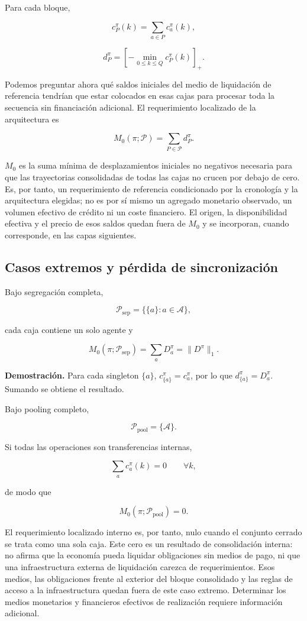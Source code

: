 \documentclass[10pt,a5paper,twoside]{article}
\begin{document}
Para cada bloque,

\[
c^\pi_P(k)
=
\sum_{a\in P}c^\pi_a(k),
\]

\[
d^\pi_P
=
\left[
-\min_{0\le k\le Q}c^\pi_P(k)
\right]_+.
\]

Podemos preguntar ahora qué saldos iniciales del medio de liquidación de referencia
tendrían que estar colocados en esas cajas para procesar toda la secuencia sin
financiación adicional. El requerimiento localizado de la arquitectura es

\[
M_0(\pi;\mathcal P)
=
\sum_{P\in\mathcal P}d^\pi_P.
\]

\(M_0\) es la suma mínima de desplazamientos iniciales no negativos
necesaria para que las trayectorias consolidadas de todas las cajas no
crucen por debajo de cero. Es, por tanto, un requerimiento de referencia
condicionado por la cronología y la arquitectura elegidas; no es por sí mismo
un agregado monetario observado, un volumen efectivo de crédito ni un coste
financiero. El origen, la disponibilidad efectiva y el precio de esos saldos
quedan fuera de \(M_0\) y se incorporan, cuando corresponde, en las capas
siguientes.

\subsection{Casos extremos y pérdida de sincronización}\label{casos-extremos-y-puxe9rdida-de-sincronizaciuxf3n}

Bajo segregación completa,

\[
\mathcal P_{\mathrm{sep}}
=
\{\{a\}:a\in\mathcal A\},
\]

cada caja contiene un solo agente y

\[
M_0(\pi;\mathcal P_{\mathrm{sep}})
=
\sum_aD^\pi_a
=
\|D^\pi\|_1.
\]

\textbf{Demostración.} Para cada singleton \(\{a\}\),
\(c^\pi_{\{a\}}=c^\pi_a\), por lo que \(d^\pi_{\{a\}}=D^\pi_a\). Sumando
se obtiene el resultado.

Bajo pooling completo,

\[
\mathcal P_{\mathrm{pool}}=\{\mathcal A\}.
\]

Si todas las operaciones son transferencias internas,

\[
\sum_a c^\pi_a(k)=0
\qquad
\forall k,
\]

de modo que

\[
M_0(\pi;\mathcal P_{\mathrm{pool}})=0.
\]

El requerimiento localizado interno es, por tanto, nulo cuando el conjunto
cerrado se trata como una sola caja. Este cero es un resultado de consolidación
interna: no afirma que la economía pueda liquidar obligaciones sin medios de pago,
ni que una infraestructura externa de liquidación carezca de requerimientos. Esos
medios, las obligaciones frente al exterior del bloque consolidado y las reglas de
acceso a la infraestructura quedan fuera de este caso extremo. Determinar los medios
monetarios y financieros efectivos de realización requiere información adicional.
\end{document}
